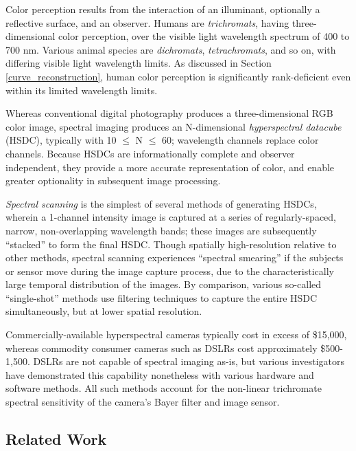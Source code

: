 \documentclass[twocolumn,10pt]{asme2ej}
\newcommand{\id}{\hspace{6 mm}}
\begin{document}
Color perception results from the interaction of an illuminant, optionally a reflective surface, and an observer. Humans are \textit{trichromats}, having three-dimensional color perception, over the visible light wavelength spectrum of 400 to 700 nm. Various animal species are \textit{dichromats}, \textit{tetrachromats}, and so on, with differing visible light wavelength limits. As discussed in Section \ref{curve_reconstruction}, human color perception is significantly rank-deficient even within its limited wavelength limits.


\id Whereas conventional digital photography produces a three-dimensional RGB color image, spectral imaging produces an N-dimensional \textit{hyperspectral datacube} (HSDC), typically with 10 $\leq$ N $\leq$ 60; wavelength channels replace color channels. Because HSDCs are informationally complete and observer independent, they provide a more accurate representation of color, and enable greater optionality in subsequent image processing.


\id \textit{Spectral scanning} is the simplest of several methods of generating HSDCs, wherein a 1-channel intensity image is captured at a series of regularly-spaced, narrow, non-overlapping wavelength bands; these images are subsequently ``stacked'' to form the final HSDC. Though spatially high-resolution relative to other methods, spectral scanning experiences ``spectral smearing'' if the subjects or sensor move during the image capture process, due to the characteristically large temporal distribution of the images. By comparison, various so-called ``single-shot'' methods use filtering techniques to capture the entire HSDC simultaneously, but at lower spatial resolution.


\id Commercially-available hyperspectral cameras typically cost in excess of \$15,000, whereas commodity consumer cameras such as DSLRs cost approximately \$500-1,500. DSLRs are not capable of spectral imaging as-is, but various investigators have demonstrated this capability nonetheless with various hardware and software methods. All such methods account for the non-linear trichromate spectral sensitivity of the camera's Bayer filter and image sensor.

\subsection{Related Work}
\end{document}
